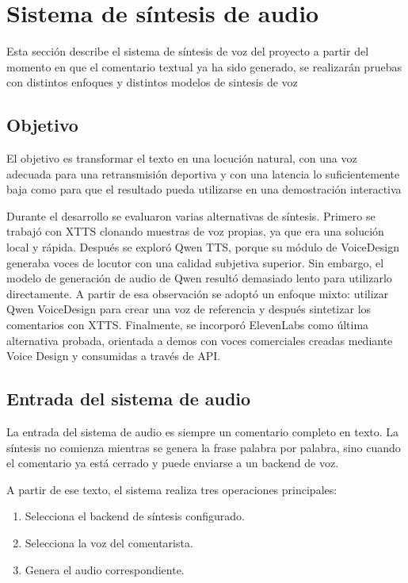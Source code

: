 \section{Sistema de síntesis de audio}
\label{sec:sintesis-voz-pipeline}

Esta sección describe el sistema de síntesis de voz del proyecto a partir del momento en que el comentario textual ya ha sido generado, se realizarán pruebas con distintos enfoques y distintos modelos de sintesis de voz

\subsection{Objetivo}

El objetivo es transformar el texto en una locución natural, con una voz adecuada para una retransmisión deportiva y con una latencia lo suficientemente baja como para que el resultado pueda utilizarse en una demostración interactiva

Durante el desarrollo se evaluaron varias alternativas de síntesis. Primero se trabajó con XTTS clonando muestras de voz propias, ya que era una solución local y rápida. Después se exploró Qwen TTS, porque su módulo de VoiceDesign generaba voces de locutor con una calidad subjetiva superior. Sin embargo, el modelo de generación de audio de Qwen resultó demasiado lento para utilizarlo directamente. A partir de esa observación se adoptó un enfoque mixto: utilizar Qwen VoiceDesign para crear una voz de referencia y después sintetizar los comentarios con XTTS. Finalmente, se incorporó ElevenLabs como última alternativa probada, orientada a demos con voces comerciales creadas mediante Voice Design y consumidas a través de API.

\subsection{Entrada del sistema de audio}

La entrada del sistema de audio es siempre un comentario completo en texto. La síntesis no comienza mientras se genera la frase palabra por palabra, sino cuando el comentario ya está cerrado y puede enviarse a un backend de voz.

A partir de ese texto, el sistema realiza tres operaciones principales:

\begin{enumerate}
    \item Selecciona el backend de síntesis configurado.
    \item Selecciona la voz del comentarista.
    \item Genera el audio correspondiente.
\end{enumerate}

